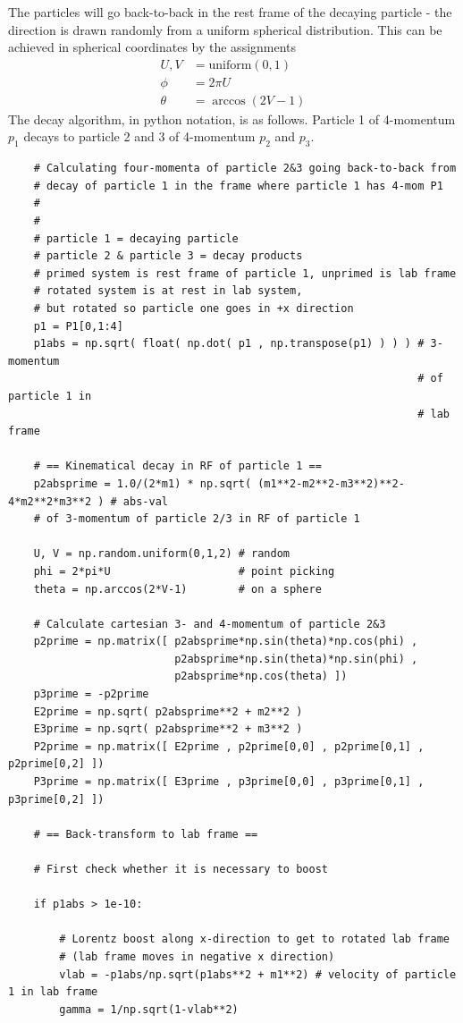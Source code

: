 \documentclass[twoside,english]{uiofysmaster}
\begin{document}
 The particles will go back-to-back in the rest frame of the decaying particle - the direction is drawn randomly from a uniform spherical distribution. This can be achieved in spherical coordinates by the assignments
\begin{align}
	U, V &= \text{uniform}(0,1)\nonumber \\
	\phi &= 2\pi U\\
	\theta &= \arccos(2V-1) \nonumber
\end{align}
The decay algorithm, in python notation, is as follows. Particle 1 of 4-momentum $p_1$ decays to particle 2 and 3 of 4-momentum $p_2$ and $p_3$. 
\begin{lstlisting}
	# Calculating four-momenta of particle 2&3 going back-to-back from
	# decay of particle 1 in the frame where particle 1 has 4-mom P1
	#
	#
	# particle 1 = decaying particle
	# particle 2 & particle 3 = decay products
	# primed system is rest frame of particle 1, unprimed is lab frame
	# rotated system is at rest in lab system,
	# but rotated so particle one goes in +x direction
	p1 = P1[0,1:4]
	p1abs = np.sqrt( float( np.dot( p1 , np.transpose(p1) ) ) ) # 3-momentum 
																# of particle 1 in 
												      			# lab frame

	# == Kinematical decay in RF of particle 1 ==
	p2absprime = 1.0/(2*m1) * np.sqrt( (m1**2-m2**2-m3**2)**2- 4*m2**2*m3**2 ) # abs-val
	# of 3-momentum of particle 2/3 in RF of particle 1

	U, V = np.random.uniform(0,1,2) # random 
	phi = 2*pi*U 					# point picking 
	theta = np.arccos(2*V-1) 		# on a sphere

	# Calculate cartesian 3- and 4-momentum of particle 2&3
	p2prime = np.matrix([ p2absprime*np.sin(theta)*np.cos(phi) , 
						  p2absprime*np.sin(theta)*np.sin(phi) , 
						  p2absprime*np.cos(theta) ])
	p3prime = -p2prime
	E2prime = np.sqrt( p2absprime**2 + m2**2 )
	E3prime = np.sqrt( p2absprime**2 + m3**2 )
	P2prime = np.matrix([ E2prime , p2prime[0,0] , p2prime[0,1] , p2prime[0,2] ])
	P3prime = np.matrix([ E3prime , p3prime[0,0] , p3prime[0,1] , p3prime[0,2] ])

	# == Back-transform to lab frame ==

	# First check whether it is necessary to boost

	if p1abs > 1e-10:

		# Lorentz boost along x-direction to get to rotated lab frame
		# (lab frame moves in negative x direction)
	 	vlab = -p1abs/np.sqrt(p1abs**2 + m1**2) # velocity of particle 1 in lab frame
		gamma = 1/np.sqrt(1-vlab**2)


\end{lstlisting}
\end{document}
